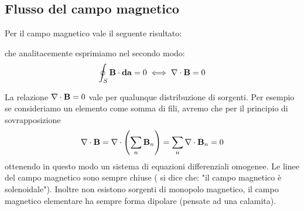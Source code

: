 \subsection{Flusso del campo magnetico}
Per il campo magnetico vale il seguente risultato:
\begin{center}
\end{center}
che analitacemente esprimiamo nel secondo modo:
\begin{equation*}
	\oint_{S} \bold{B} \cdot \bold{da} = 0 \iff \nabla \cdot \bold{B} =0
\end{equation*}

La relazione $\nabla \cdot \bold{B} = 0$ vale per qualunque distribuzione di sorgenti. Per esempio se consideriamo un elemento come somma di fili, avremo che per il principio di sovrapposizione
\begin{equation*}
	\nabla \cdot \bold{B} = \nabla \cdot \left (\sum_{n} \bold{B}_{n}\right ) = \sum_{n} \nabla \cdot \bold{B}_n =0
\end{equation*}
ottenendo in questo modo un sistema di equazioni differenziali omogenee. Le linee del campo magnetico sono sempre chiuse ( si dice che: "il campo magnetico \`e solenoidale"). Inoltre non esistono sorgenti di monopolo magnetico, il campo magnetico elementare ha sempre forma dipolare (pensate ad una calamita).

